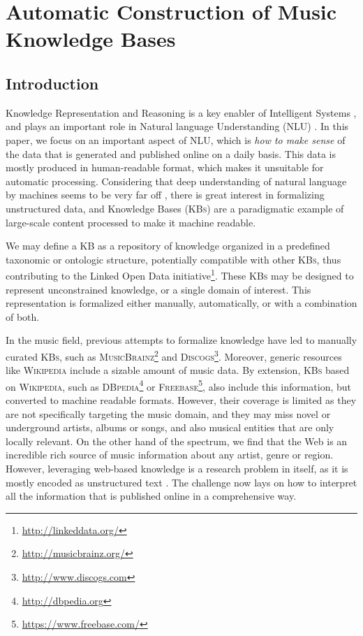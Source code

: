 
\chapter{Automatic Construction of Music Knowledge Bases}
\label{sec:kb}

\section{Introduction}\label{sec:introduction}

Knowledge Representation and Reasoning is a key enabler of Intelligent Systems \cite{Suchaneketal2007}, and plays an important role in Natural language Understanding (NLU) \cite{BaralandDeGiacomo2015}.
In this paper, we focus on an important aspect of NLU, which is \textit{how to make sense} of the data that is generated and published online on a daily basis. This data is mostly produced in human-readable format, which makes it unsuitable for automatic processing. Considering that deep understanding of natural language by machines seems to be very far off \cite{CambriaandWhite2014}, there is great interest in formalizing unstructured data, and Knowledge Bases (\textsc{KBs}) are a paradigmatic example of large-scale content processed to make it machine readable.

We may define a \textsc{KB} as a repository of knowledge organized in a predefined taxonomic or ontologic structure, potentially compatible with other \textsc{KBs}, thus contributing to the Linked Open Data initiative\footnote{\url{http://linkeddata.org/}}. These \textsc{KBs} may be designed to represent unconstrained knowledge, or a single domain of interest. This representation is formalized either manually, automatically, or with a combination of both.

In the music field, previous attempts to formalize knowledge have led to manually curated \textsc{KBs}, such as \textsc{MusicBrainz}\footnote{\url{http://musicbrainz.org/}} and \textsc{Discogs}\footnote{\url{http://www.discogs.com}}. Moreover, generic resources like \textsc{Wikipedia} include a sizable amount of music data. By extension, \textsc{KBs} based on \textsc{Wikipedia}, such as \textsc{DBpedia}\footnote{\url{http://dbpedia.org}} or \textsc{Freebase}\footnote{\url{https://www.freebase.com/}}, also include this information, but converted to machine readable formats. However, their coverage is limited as they are not specifically targeting the music domain, and they may miss novel or underground artists, albums or songs, and also musical entities that are only locally relevant. 
On the other hand of the spectrum, we find that the Web is an incredible rich source of music information about any artist, genre or region. However, leveraging web-based knowledge is a research problem in itself, as it is mostly encoded as unstructured text \cite{Oramas2014b}. The challenge now lays on how to interpret all the information that is published online in a comprehensive way.

